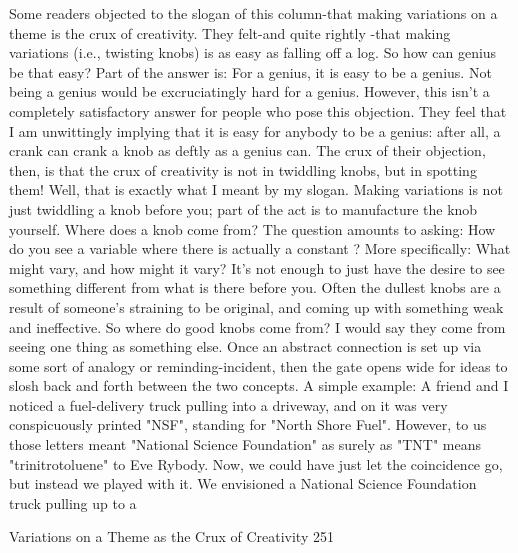          Some readers objected to the slogan of this column-that making variations on
a theme is the crux of creativity. They felt-and quite rightly -that making variations
(i.e., twisting knobs) is as easy as falling off a log. So how can genius be that easy?
Part of the answer is: For a genius, it is easy to be a genius. Not being a genius would
be excruciatingly hard for a genius. However, this isn't a completely satisfactory
answer for people who pose this objection. They feel that I am unwittingly implying
that it is easy for anybody to be a genius: after all, a crank can crank a knob as deftly
as a genius can. The crux of their objection, then, is that the crux of creativity is not in
twiddling knobs, but in spotting them!
         Well, that is exactly what I meant by my slogan. Making variations is not just
twiddling a knob before you; part of the act is to manufacture the knob yourself.
Where does a knob come from? The question amounts to asking: How do you see a
variable where there is actually a constant ? More specifically: What might vary, and
how might it vary? It's not enough to just have the desire to see something different
from what is there before you. Often the dullest knobs are a result of someone's
straining to be original, and coming up with something weak and ineffective. So
where do good knobs come from? I would say they come from seeing one thing as
something else. Once an abstract connection is set up via some sort of analogy or
reminding-incident, then the gate opens wide for ideas to slosh back and forth
between the two concepts.
         A simple example: A friend and I noticed a fuel-delivery truck pulling into a
driveway, and on it was very conspicuously printed "NSF", standing for "North Shore
Fuel". However, to us those letters meant "National Science Foundation" as surely as
"TNT" means "trinitrotoluene" to Eve Rybody. Now, we could have just let the
coincidence go, but instead we played with it. We envisioned a National Science
Foundation truck pulling up to a




Variations on a Theme as the Crux of Creativity                                        251

